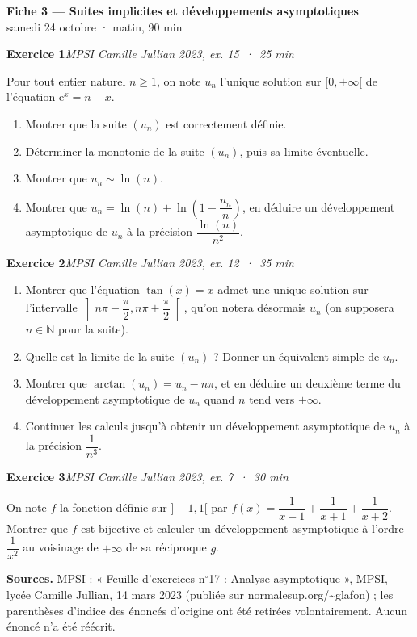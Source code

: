 \documentclass[11pt,a4paper]{article}
\newcommand{\N}{\mathbb{N}}
\newcommand{\ee}{\mathrm{e}}
\newcommand{\exo}[3]{\vspace{1.1em}\noindent\textbf{\large #1}\hfill\textit{#2 \,·\, #3}\par\smallskip}
\begin{document}
\begin{center}
{\LARGE\bfseries Fiche 3 — Suites implicites et développements asymptotiques}\\[0.3em]
{\large samedi 24 octobre · matin, 90 min}
\end{center}

\noindent{}


\exo{Exercice 1}{MPSI Camille Jullian 2023, ex. 15}{25 min}
\noindent Pour tout entier naturel $n\geqslant 1$, on note $u_n$ l'unique solution sur $[0,+\infty[$ de l'équation $\ee^x=n-x$.
\begin{enumerate}
\item Montrer que la suite $(u_n)$ est correctement définie.
\item Déterminer la monotonie de la suite $(u_n)$, puis sa limite éventuelle.
\item Montrer que $u_n\sim\ln(n)$.
\item Montrer que $u_n=\ln(n)+\ln\!\left(1-\dfrac{u_n}{n}\right)$, en déduire un développement asymptotique de $u_n$ à la précision $\dfrac{\ln(n)}{n^2}$.
\end{enumerate}

\exo{Exercice 2}{MPSI Camille Jullian 2023, ex. 12}{35 min}
\begin{enumerate}
\item Montrer que l'équation $\tan(x)=x$ admet une unique solution sur l'intervalle $\left]n\pi-\dfrac\pi2,n\pi+\dfrac\pi2\right[$, qu'on notera désormais $u_n$ (on supposera $n\in\N$ pour la suite).
\item Quelle est la limite de la suite $(u_n)$ ? Donner un équivalent simple de $u_n$.
\item Montrer que $\arctan(u_n)=u_n-n\pi$, et en déduire un deuxième terme du développement asymptotique de $u_n$ quand $n$ tend vers $+\infty$.
\item Continuer les calculs jusqu'à obtenir un développement asymptotique de $u_n$ à la précision $\dfrac1{n^3}$.
\end{enumerate}

\exo{Exercice 3}{MPSI Camille Jullian 2023, ex. 7}{30 min}
\noindent On note $f$ la fonction définie sur $]-1,1[$ par $f(x)=\dfrac{1}{x-1}+\dfrac{1}{x+1}+\dfrac{1}{x+2}$. Montrer que $f$ est bijective et calculer un développement asymptotique à l'ordre $\dfrac{1}{x^2}$ au voisinage de $+\infty$ de sa réciproque $g$.

\vfill
\begin{small}
\noindent\textbf{Sources.} MPSI : « Feuille d'exercices n$^{\circ}$17 : Analyse asymptotique », MPSI, lycée Camille Jullian, 14 mars 2023 (publiée sur normalesup.org/\textasciitilde glafon) ; les parenthèses d'indice des énoncés d'origine ont été retirées volontairement. Aucun énoncé n'a été réécrit.
\end{small}
\end{document}
